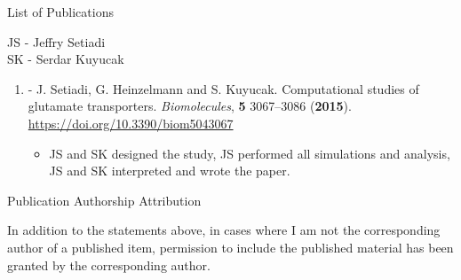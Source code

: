 \newpage

\vspace{3in}

\begin{center}
\begin{Large}
\begin{bfseries}
List of Publications
\end{bfseries}
\end{Large}
\end{center}

\vspace{0.3in}
\hspace{\parindent}JS - Jeffry Setiadi \\
\hspace{\parindent} SK - Serdar Kuyucak \\

\begin{enumerate}
	\item {} - J. Setiadi, G. Heinzelmann and S. Kuyucak. Computational 
		studies of glutamate transporters. {\it Biomolecules}, {\bf 5} 3067--3086 (\textbf{2015}).
		\url{https://doi.org/10.3390/biom5043067}

		\begin{itemize}
			\item JS and SK designed the study, JS performed all simulations and analysis, JS and SK interpreted and wrote the paper.
		\end{itemize}
\end{enumerate}


\newpage
\begin{center}
\begin{Large}
\begin{bfseries}
Publication Authorship Attribution
\end{bfseries}
\end{Large}
\end{center}

\vspace{0.3in}
\noindent In addition to the statements above, in cases where I am not the 
corresponding author of a published item, permission to include the published 
material has been granted by the corresponding author.

\vspace{1.in}

